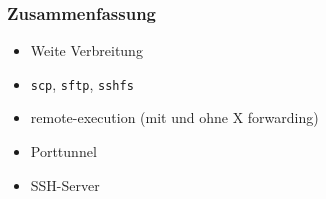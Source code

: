 \begin{frame}
\frametitle{Zusammenfassung}
\begin{itemize}
\item Weite Verbreitung
\item  \texttt{scp}, \texttt{sftp}, \texttt{sshfs}
\item remote-execution (mit und ohne X forwarding)
\item Porttunnel
\item SSH-Server
\end{itemize}
\end{frame}